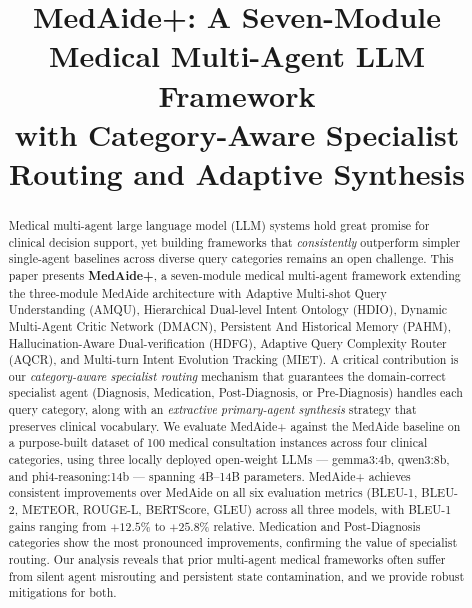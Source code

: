 \documentclass[conference]{IEEEtran}
\begin{document}
\title{MedAide+: A Seven-Module Medical Multi-Agent LLM Framework\\
with Category-Aware Specialist Routing and Adaptive Synthesis}

\author{
}

\maketitle

\begin{abstract}
Medical multi-agent large language model (LLM) systems hold great promise for clinical
decision support, yet building frameworks that \emph{consistently} outperform simpler
single-agent baselines across diverse query categories remains an open challenge. This
paper presents \textbf{MedAide+}, a seven-module medical multi-agent framework extending
the three-module MedAide architecture with Adaptive Multi-shot Query Understanding
(AMQU), Hierarchical Dual-level Intent Ontology (HDIO), Dynamic Multi-Agent Critic
Network (DMACN), Persistent And Historical Memory (PAHM), Hallucination-Aware
Dual-verification (HDFG), Adaptive Query Complexity Router (AQCR), and Multi-turn
Intent Evolution Tracking (MIET). A critical contribution is our \emph{category-aware
specialist routing} mechanism that guarantees the domain-correct specialist agent
(Diagnosis, Medication, Post-Diagnosis, or Pre-Diagnosis) handles each query category,
along with an \emph{extractive primary-agent synthesis} strategy that preserves clinical
vocabulary. We evaluate MedAide+ against the MedAide baseline on a purpose-built dataset
of 100 medical consultation instances across four clinical categories, using three locally
deployed open-weight LLMs — gemma3:4b, qwen3:8b, and phi4-reasoning:14b — spanning
4B–14B parameters. MedAide+ achieves consistent improvements over MedAide on all six
evaluation metrics (BLEU-1, BLEU-2, METEOR, ROUGE-L, BERTScore, GLEU) across all
three models, with BLEU-1 gains ranging from $+12.5$\% to $+25.8$\% relative. Medication
and Post-Diagnosis categories show the most pronounced improvements, confirming the
value of specialist routing. Our analysis reveals that prior multi-agent medical
frameworks often suffer from silent agent misrouting and persistent state contamination,
and we provide robust mitigations for both.
\end{abstract}
\end{document}

